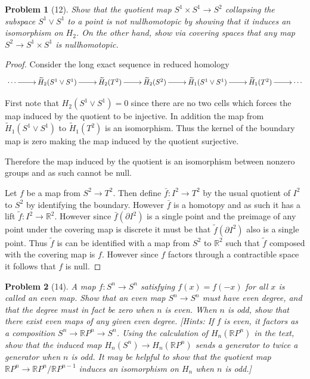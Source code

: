 \documentclass[10pt]{article}
\newcommand{\sk}{\vskip 10mm}
\newcommand{\bb}[1]{\mathbb{#1}}
\theoremstyle{plain}
\newtheorem{problem}{Problem}
\theoremstyle{remark}
\begin{document}
\begin{problem}[12]
  Show that the quotient map $S^1\times S^1\rightarrow S^2$ collapsing the
  subspace $S^1\vee S^1$ to a point is not nullhomotopic
  by showing that it induces an isomorphism on $H_2$. On the
  other hand, show via covering spaces that any map
  $S^2\rightarrow S^1\times S^1$ is nullhomotopic.
\end{problem}

\begin{proof}
  Consider the long exact sequence in reduced homology
  \[
    \xymatrix{
      \cdots \ar[r] & \widetilde{H}_2(S^1\vee S^1) \ar[r] & \widetilde{H}_2(T^2) \ar[r] & \widetilde{H}_2(S^2) \ar[r] & \widetilde{H}_1(S^1\vee S^1) \ar[r] & \widetilde{H}_1(T^2) \ar[r] & \cdots
    }
  \]

  First note that $H_2(S^1\vee S^1)= 0$ since there are no two cells which forces
  the map induced by the quotient to be injective.
  In addition the map from $\widetilde{H}_1(S^1\vee S^1)$ to $\widetilde{H}_1(T^2)$
  is an isomorphism. Thus the kernel of the boundary map is zero making
  the map induced by the quotient surjective.

  Therefore the map induced by the quotient is an isomorphism between nonzero groups
  and as such cannot be null.
  
  \sk
  
  Let $f$ be a map from $S^2\rightarrow T^2$. Then define $\bar{f}:I^2\rightarrow T^2$
  by the usual quotient of $I^2$ to $S^2$ by identifying the boundary.
  However $\bar{f}$ is a homotopy and as such it has a lift
  $\widetilde{f}:I^2\rightarrow \bb{R}^2$. However since $\bar{f}(\partial I^2)$ is
  a single point and the preimage of any point under the covering
  map is discrete it must be that $\widetilde{f}(\partial I^2)$ also is a
  single point. Thus $\widetilde{f}$ is can be identified with a map
  from $S^2$ to $\bb{R}^2$ such that $\widetilde{f}$ composed with the
  covering map is $f$. However since $f$ factors through a contractible
  space it follows that $f$ is null.
\end{proof}

\sk

\begin{problem}[14]
  A map $f:S^n\rightarrow S^n$ satisfying $f(x)=f(-x)$ for all $x$ is called
  an even map. Show that an even map $S^n\rightarrow S^n$ must have even
  degree, and that the degree must in fact be zero when $n$ is even.
  When $n$ is odd, show that there exist even maps of any given even
  degree. [Hints: If $f$ is even, it factors as a composition
  $S^n\rightarrow\bb{R}P^n\rightarrow S^n$. Using the calculation of
  $H_n(\bb{R}P^n)$ in the text, show that the induced map
  $H_n(S^n)\rightarrow H_n(\bb{R}P^n)$ sends a generator to twice a
  generator when $n$ is odd. It may be helpful to show that the
  quotient map $\bb{R}P^n\rightarrow \bb{R}P^n/\bb{R}P^{n-1}$ induces an
  isomorphism on $H_n$ when $n$ is odd.]
\end{problem}
\end{document}
